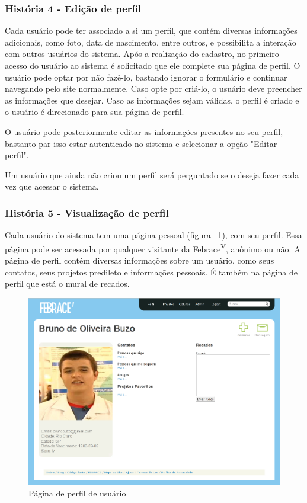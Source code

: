     \subsubsection{História 4 - Edição de perfil}
      Cada usuário pode ter associado a si um perfil, que contém diversas informações adicionais, como foto, data de nascimento, entre outros, e possibilita a interação com outros usuários do sistema. Após a realização do cadastro, no primeiro acesso do usuário ao sistema é solicitado que ele complete sua página de perfil. O usuário pode optar por não fazê-lo, bastando ignorar o formulário e continuar navegando pelo site normalmente. Caso opte por criá-lo, o usuário deve preencher as informações que desejar. Caso as informações sejam válidas, o perfil é criado e o usuário é direcionado para sua página de perfil.

      O usuário pode posteriormente editar as informações presentes no seu perfil, bastanto par isso estar autenticado no sistema e selecionar a opção "Editar perfil".

      Um usuário que ainda não criou um perfil será perguntado se o deseja fazer cada vez que acessar o sistema.

    \subsubsection{História 5 - Visualização de perfil}
      Cada usuário do sistema tem uma página pessoal (figura ~\ref{perfil}), com seu perfil. Essa página pode ser acessada por qualquer visitante da Febrace\textsuperscript{V}, anônimo ou não. A página de perfil contém diversas informações sobre um usuário, como seus contatos, seus projetos predileto e informações pessoais. É também na página de perfil que está o mural de recados.

    \begin{figure}[h]
        \begin{center}
    \includegraphics[width=1.0\linewidth]{arquivos/perfil.png}
        \end{center}
        \caption{Página de perfil de usuário}
        \label{perfil}
    \end{figure}

